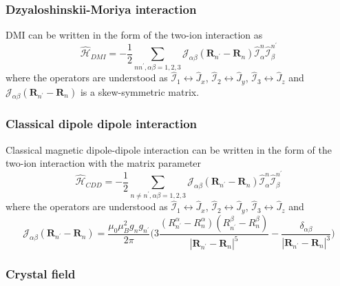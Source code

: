 \documentclass[twoside]{article}
\begin{document}
{\subsubsection{Dzyaloshinskii-Moriya interaction}

DMI can be written in the form of the two-ion interaction as
\begin{equation}
    \hat{\mathcal{H}}_{DMI}
    =
    -
    \frac{1}{2}
    \sum_{nn^{\prime},\alpha\beta=1,2,3}
    \mathcal{J}_{\alpha\beta}(\mathbf{R}_{n^{\prime}} - \mathbf{R}_{n})
    \hat{\mathcal{I}}_{\alpha}^n
    \hat{\mathcal{I}}_{\beta}^{n^{\prime}}
\end{equation}
where the operators are understood as
$\hat{\mathcal{I}}_{1}  \leftrightarrow \hat{J}_x$,
$\hat{\mathcal{I}}_{2}  \leftrightarrow \hat{J}_y$,
$\hat{\mathcal{I}}_{3}  \leftrightarrow \hat{J}_z$ and
$\mathcal{J}_{\alpha\beta}(\mathbf{R}_{n^{\prime}} - \mathbf{R}_{n})$ is a
skew-symmetric matrix.

\subsubsection{Classical dipole dipole interaction}

Classical magnetic dipole-dipole interaction can be written in the form of the
two-ion interaction with the matrix parameter 
\begin{equation}
    \hat{\mathcal{H}}_{CDD}
    =
    -
    \frac{1}{2}
    \sum_{n\ne n^{\prime},\alpha\beta=1,2,3}
    \mathcal{J}_{\alpha\beta}(\mathbf{R}_{n^{\prime}} - \mathbf{R}_{n})
    \hat{\mathcal{I}}_{\alpha}^n
    \hat{\mathcal{I}}_{\beta}^{n^{\prime}}
\end{equation}
where the operators are understood as
$\hat{\mathcal{I}}_{1}  \leftrightarrow \hat{J}_x$,
$\hat{\mathcal{I}}_{2}  \leftrightarrow \hat{J}_y$,
$\hat{\mathcal{I}}_{3}  \leftrightarrow \hat{J}_z$ and 
\begin{equation}
    \mathcal{J}_{\alpha\beta}(\mathbf{R}_{n^{\prime}} - \mathbf{R}_{n})
    =
    \frac{\mu_0\mu_B^2 g_n g_{n^{\prime}}}{2\pi}
    \Biggl(
        3\frac{(R_{n^{\prime}}^{\alpha} - R_{n}^{\alpha})(R_{n^{\prime}}^{\beta} - R_{n}^{\beta})}{|\mathbf{R}_{n^{\prime}} - \mathbf{R}_{n}|^5}
        -
        \frac{\delta_{\alpha\beta}}{|\mathbf{R}_{n^{\prime}} - \mathbf{R}_{n}|^3}
    \Biggr)
\end{equation}

\subsubsection{Crystal field}

}
\end{document}
